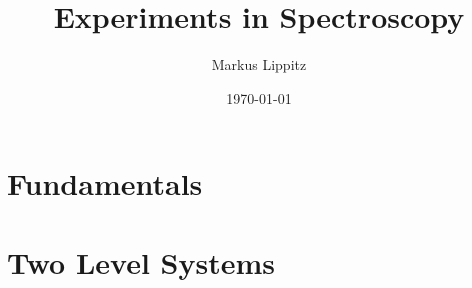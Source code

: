 \documentclass[notoc,nofonts,a4paper,oneside,nobib]{tufte-book}
\begin{document}
\title{Experiments in Spectroscopy}

\author{Markus Lippitz}
\date{\today}


\maketitle



\tableofcontents
%
\part{Fundamentals}







%

%
%
\part{Two Level Systems}



%



%
%
%
%
%
%
%
%
%

%
%
%
%
%
%
%
%
%
%
%
%



\printbibliography
\end{document}
